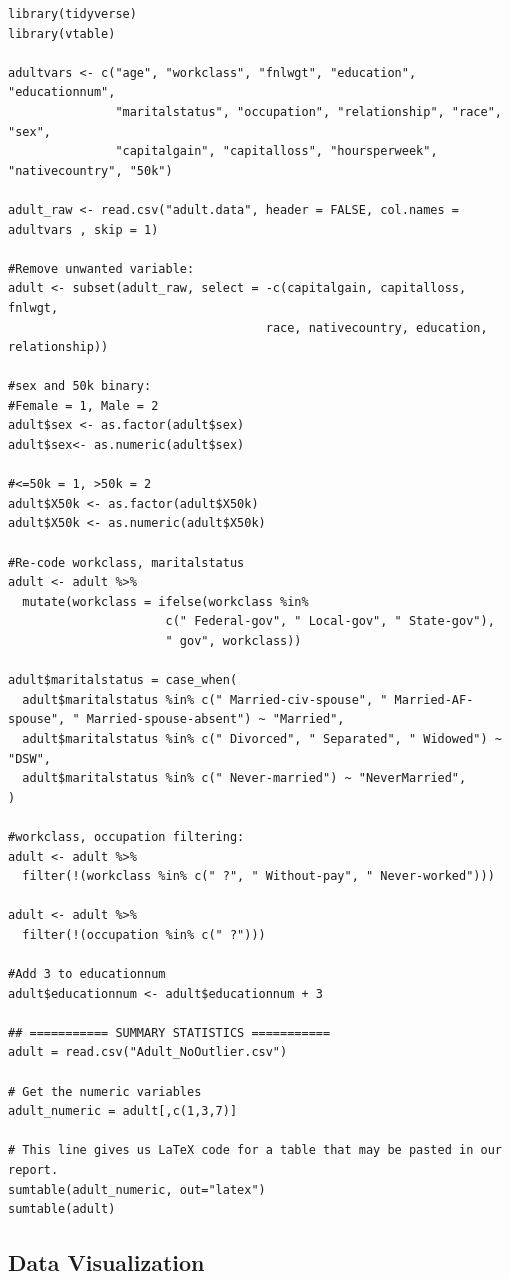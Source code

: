 \documentclass{article}
\begin{document}
\begin{verbatim}
library(tidyverse)
library(vtable)

adultvars <- c("age", "workclass", "fnlwgt", "education", "educationnum", 
               "maritalstatus", "occupation", "relationship", "race", "sex", 
               "capitalgain", "capitalloss", "hoursperweek", "nativecountry", "50k")

adult_raw <- read.csv("adult.data", header = FALSE, col.names = adultvars , skip = 1)

#Remove unwanted variable:
adult <- subset(adult_raw, select = -c(capitalgain, capitalloss, fnlwgt,
                                    race, nativecountry, education, relationship))

#sex and 50k binary:
#Female = 1, Male = 2
adult$sex <- as.factor(adult$sex)
adult$sex<- as.numeric(adult$sex) 

#<=50k = 1, >50k = 2
adult$X50k <- as.factor(adult$X50k)
adult$X50k <- as.numeric(adult$X50k)

#Re-code workclass, maritalstatus
adult <- adult %>%
  mutate(workclass = ifelse(workclass %in% 
                      c(" Federal-gov", " Local-gov", " State-gov"), 
                      " gov", workclass))

adult$maritalstatus = case_when(
  adult$maritalstatus %in% c(" Married-civ-spouse", " Married-AF-spouse", " Married-spouse-absent") ~ "Married",
  adult$maritalstatus %in% c(" Divorced", " Separated", " Widowed") ~ "DSW",
  adult$maritalstatus %in% c(" Never-married") ~ "NeverMarried",
)

#workclass, occupation filtering:
adult <- adult %>% 
  filter(!(workclass %in% c(" ?", " Without-pay", " Never-worked")))

adult <- adult %>%
  filter(!(occupation %in% c(" ?")))

#Add 3 to educationnum
adult$educationnum <- adult$educationnum + 3

## =========== SUMMARY STATISTICS ===========
adult = read.csv("Adult_NoOutlier.csv")

# Get the numeric variables
adult_numeric = adult[,c(1,3,7)]

# This line gives us LaTeX code for a table that may be pasted in our report.
sumtable(adult_numeric, out="latex")
sumtable(adult)

\end{verbatim}

\subsection{Data Visualization} \label{sec:dataVizCode}
\end{document}
